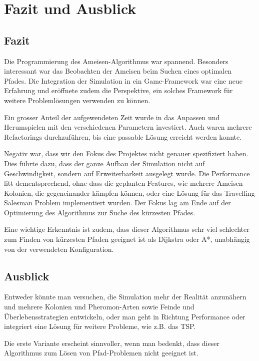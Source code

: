 

\chapter{Fazit und Ausblick}


\section{Fazit}

Die Programmierung des Ameisen-Algorithmus war spannend. Besonders interessant war das Beobachten der Ameisen beim Suchen eines optimalen Pfades. Die Integration der Simulation in ein Game-Framework war eine neue Erfahrung und eröffnete zudem die Perspektive, ein solches Framework für weitere Problemlösungen verwenden zu können.

Ein grosser Anteil der aufgewendeten Zeit wurde in das Anpassen und Herumspielen mit den verschiedenen Parametern investiert. Auch waren mehrere Refactorings durchzuführen, bis eine passable Lösung erreicht werden konnte.

Negativ war, dass wir den Fokus des Projektes nicht genauer spezifiziert haben. Dies führte dazu, dass der ganze Aufbau der Simulation nicht auf Geschwindigkeit, sondern auf Erweiterbarkeit ausgelegt wurde. Die Performance litt dementsprechend, ohne dass die geplanten Features, wie mehrere Ameisen-Kolonien, die gegeneinander kämpfen können, oder eine Lösung für das Travelling Salesman Problem implementiert wurden. Der Fokus lag am Ende auf der Optimierung des Algorithmus zur Suche des kürzesten Pfades.

Eine wichtige Erkenntnis ist zudem, dass dieser Algorithmus sehr viel schlechter zum Finden von kürzesten Pfaden geeignet ist als Dijkstra oder A*, unabhängig von der verwendeten Konfiguration.




\section{Ausblick}

Entweder könnte man versuchen, die Simulation mehr der Realität anzunähern und mehrere Kolonien und Pheromon-Arten sowie Feinde und Überlebensstrategien entwickeln, oder man geht in Richtung Performance oder integriert eine Lösung für weitere Probleme, wie z.B. das TSP.

Die erste Variante erscheint sinnvoller, wenn man bedenkt, dass dieser Algorithmus zum Lösen von Pfad-Problemen nicht geeignet ist.


